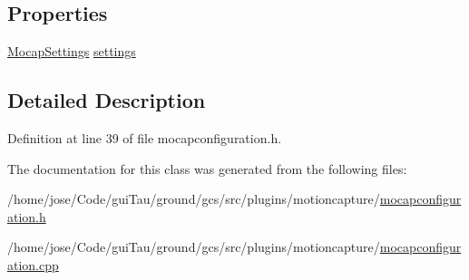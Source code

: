 \subsection*{Properties}
\begin{DoxyCompactItemize}
\item 
\hyperlink{group___mo_cap_plugin_ga6083347a5b3eb70e360f599354dc0f0b}{Mocap\-Settings} \hyperlink{group___h_i_t_l_plugin_ga7211120cc5d6c7feffb594a36552a9af}{settings}
\end{DoxyCompactItemize}


\subsection{Detailed Description}


Definition at line 39 of file mocapconfiguration.\-h.



The documentation for this class was generated from the following files\-:\begin{DoxyCompactItemize}
\item 
/home/jose/\-Code/gui\-Tau/ground/gcs/src/plugins/motioncapture/\hyperlink{mocapconfiguration_8h}{mocapconfiguration.\-h}\item 
/home/jose/\-Code/gui\-Tau/ground/gcs/src/plugins/motioncapture/\hyperlink{mocapconfiguration_8cpp}{mocapconfiguration.\-cpp}\end{DoxyCompactItemize}
